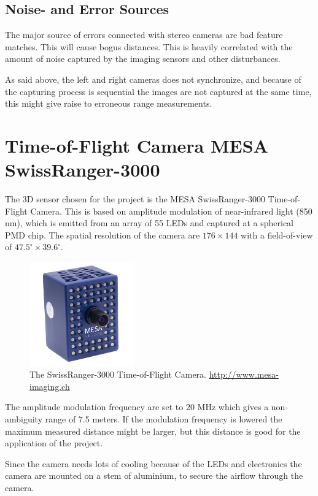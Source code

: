 \subsection{Noise- and Error Sources}
The major source of errors connected with stereo cameras are bad feature matches. This
will cause bogus distances. This is heavily correlated with the amount of noise captured
by the imaging sensors and other disturbances.

As said above, the left and right cameras does not synchronize, and because of the
capturing process is sequential the images are not captured at the same time, this might
give raise to erroneous range measurements. 




\section{Time-of-Flight Camera MESA SwissRanger-3000}
The 3D sensor chosen for the project is the MESA SwissRanger-3000 Time-of-Flight Camera.
This is based on amplitude modulation of near-infrared light (850 nm), which is emitted from an
array of 55 LEDs and captured at a spherical PMD chip. The spatial resolution of the camera
are $176\times144$ with a field-of-view of $47.5^\circ \times 39.6^\circ$. 
\begin{figure}[htbp]
    \centering
    \includegraphics[width=0.4\textwidth]{pics/sr3000}
    \caption{The SwissRanger-3000 Time-of-Flight Camera. \url{http://www.mesa-imaging.ch}}
    \label{chap3:fig-sr3000}
\end{figure}
The amplitude modulation frequency are set to 20 MHz which gives a non-ambiguity range of
7.5 meters. If the modulation frequency is lowered the maximum measured distance might be
larger, but this distance is good for the application of the project. 

Since the camera needs lots of cooling because of the LEDs and electronics the camera are
mounted on a stem of aluminium, to secure the airflow through the camera. 

